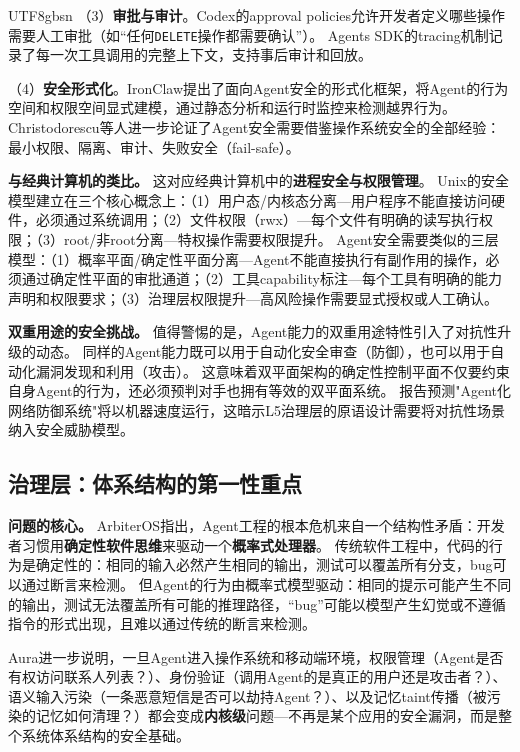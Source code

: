 \documentclass[11pt,a4paper]{article}
\begin{document}
\begin{CJK*}{UTF8}{gbsn}
（3）\textbf{审批与审计}。Codex的approval policies\cite{openai_codex_approvals_2026}允许开发者定义哪些操作需要人工审批（如``任何\texttt{DELETE}操作都需要确认''）。
Agents SDK的tracing机制\cite{openai_codex_agentsdk_2026}记录了每一次工具调用的完整上下文，支持事后审计和回放。

（4）\textbf{安全形式化}。IronClaw\cite{ironclaw2025}提出了面向Agent安全的形式化框架，将Agent的行为空间和权限空间显式建模，通过静态分析和运行时监控来检测越界行为。
Christodorescu等人\cite{agenticsecurity2025}进一步论证了Agent安全需要借鉴操作系统安全的全部经验：最小权限、隔离、审计、失败安全（fail-safe）。

\textbf{与经典计算机的类比。}
这对应经典计算机中的\textbf{进程安全与权限管理}。
Unix的安全模型建立在三个核心概念上：（1）用户态/内核态分离---用户程序不能直接访问硬件，必须通过系统调用\cite{ostep_2023}；（2）文件权限（rwx）---每个文件有明确的读写执行权限；（3）root/非root分离---特权操作需要权限提升。
Agent安全需要类似的三层模型：（1）概率平面/确定性平面分离---Agent不能直接执行有副作用的操作，必须通过确定性平面的审批通道；（2）工具capability标注---每个工具有明确的能力声明和权限要求；（3）治理层权限提升---高风险操作需要显式授权或人工确认。

\textbf{双重用途的安全挑战。}
值得警惕的是，Agent能力的双重用途特性引入了对抗性升级的动态。
同样的Agent能力既可以用于自动化安全审查（防御），也可以用于自动化漏洞发现和利用（攻击）\cite{anthropic2026agenticreport}。
这意味着双平面架构的确定性控制平面不仅要约束自身Agent的行为，还必须预判对手也拥有等效的双平面系统。
报告预测"Agent化网络防御系统"将以机器速度运行\cite{anthropic2026agenticreport}，这暗示L5治理层的原语设计需要将对抗性场景纳入安全威胁模型。

\subsection{治理层：体系结构的第一性重点}

\textbf{问题的核心。}
ArbiterOS\cite{arbiteros2025}指出，Agent工程的根本危机来自一个结构性矛盾：开发者习惯用\textbf{确定性软件思维}来驱动一个\textbf{概率式处理器}。
传统软件工程中，代码的行为是确定性的：相同的输入必然产生相同的输出，测试可以覆盖所有分支，bug可以通过断言来检测。
但Agent的行为由概率式模型驱动：相同的提示可能产生不同的输出，测试无法覆盖所有可能的推理路径，``bug''可能以模型产生幻觉或不遵循指令的形式出现，且难以通过传统的断言来检测。

Aura\cite{aura2025}进一步说明，一旦Agent进入操作系统和移动端环境，权限管理（Agent是否有权访问联系人列表？）、身份验证（调用Agent的是真正的用户还是攻击者？）、语义输入污染（一条恶意短信是否可以劫持Agent？）、以及记忆taint传播（被污染的记忆如何清理？）都会变成\textbf{内核级}问题---不再是某个应用的安全漏洞，而是整个系统体系结构的安全基础。


\end{CJK*}
\end{document}
